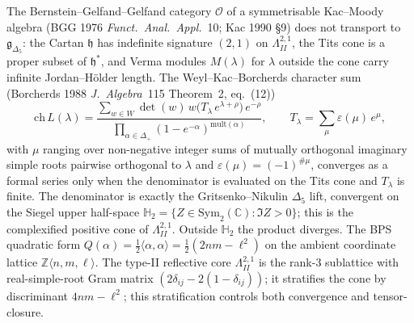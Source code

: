 The Bernstein--Gelfand--Gelfand category $\mathcal{O}$ of a
symmetrisable Kac--Moody algebra (BGG 1976 \emph{Funct.\ Anal.\
Appl.}~10; Kac 1990 \S9) does not transport to
$\mathfrak g_{\Delta_5}$: the Cartan $\mathfrak h$ has indefinite
signature $(2,1)$ on $\Lambda^{2,1}_{II}$, the Tits cone is a
proper subset of $\mathfrak h^*$, and Verma modules $M(\lambda)$
for $\lambda$ outside the cone carry infinite Jordan--H\"older
length. The Weyl--Kac--Borcherds character sum
(Borcherds 1988 \emph{J.\ Algebra}~115 Theorem~2, eq.\ (12))
\begin{equation}
\label{eq:k3ca-wkb-character}
\mathrm{ch}\,L(\lambda)
 = \frac{\sum_{w\in W} \det(w)\, w\!\bigl(T_\lambda\, e^{\lambda+\rho}\bigr)\, e^{-\rho}}
 {\prod_{\alpha\in\Delta_+}(1-e^{-\alpha})^{\mathrm{mult}(\alpha)}},
\qquad
T_\lambda = \sum_{\mu} \varepsilon(\mu)\, e^{\mu},
\end{equation}
with $\mu$ ranging over non-negative integer sums of mutually
orthogonal imaginary simple roots pairwise orthogonal to $\lambda$
and $\varepsilon(\mu) = (-1)^{\#\mu}$, converges as a formal series
only when the denominator is evaluated on the Tits cone and
$T_\lambda$ is finite. The denominator is exactly the
Gritsenko--Nikulin $\Delta_5$ lift, convergent on the Siegel upper
half-space
$\mathbb H_2 = \{Z\in\mathrm{Sym}_2(\mathbb C) : \Im Z > 0\}$; this
is the complexified positive cone of $\Lambda^{2,1}_{II}$. Outside
$\mathbb H_2$ the product diverges. The BPS quadratic form
$Q(\alpha) = \tfrac{1}{2}\langle\alpha,\alpha\rangle =
\tfrac{1}{2}(2nm - \ell^2)$ on the ambient coordinate lattice
\(\mathbb Z\langle n,m,\ell\rangle\). The type-II reflective core
\(\Lambda^{2,1}_{II}\) is the rank-$3$ sublattice with real-simple-root
Gram matrix \((2\delta_{ij}-2(1-\delta_{ij}))\); it stratifies the cone by discriminant
$4nm-\ell^2$; this stratification controls both convergence and
tensor-closure.

